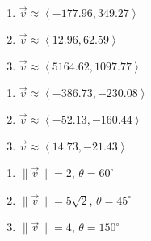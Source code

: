 \documentclass{ximera}
\begin{document}
\begin{multicols}{3}

\begin{enumerate}

\setcounter{enumi}{\value{HW}}

\item $\vec{v} \approx \left<-177.96, 349.27\right>$
\item $\vec{v} \approx \left<12.96, 62.59\right>$
\item $\vec{v} \approx \left<5164.62, 1097.77\right>$

\setcounter{HW}{\value{enumi}}

\end{enumerate}

\end{multicols}

\begin{multicols}{3}

\begin{enumerate}

\setcounter{enumi}{\value{HW}}

\item $\vec{v} \approx \left<-386.73, -230.08\right>$
\item $\vec{v} \approx \left<-52.13, -160.44\right>$
\item $\vec{v} \approx \left<14.73, -21.43\right>$

\setcounter{HW}{\value{enumi}}

\end{enumerate}

\end{multicols}

\begin{multicols}{3}

\begin{enumerate}

\setcounter{enumi}{\value{HW}}

\item  $\|\vec{v}\| = 2$, $\theta = 60^{\circ}$
\item $\|\vec{v}\| = 5\sqrt{2}$, $\theta = 45^{\circ}$
\item $\|\vec{v}\| = 4$, $\theta = 150^{\circ}$

\setcounter{HW}{\value{enumi}}

\end{enumerate}

\end{multicols}
\end{document}
